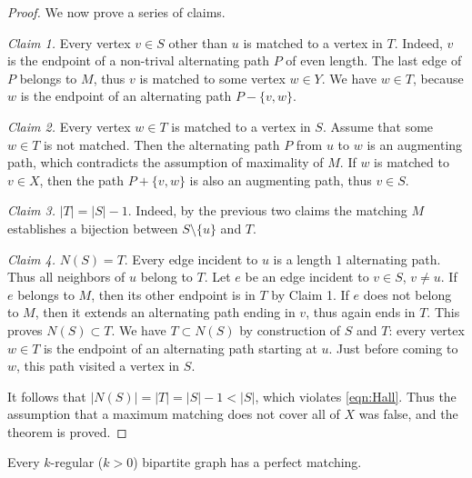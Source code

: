 \begin{page}
\begin{proof}
We now prove a series of claims.

\emph{Claim 1.} Every vertex $v \in S$ other than $u$ is matched to a vertex in $T$.
Indeed, $v$ is the endpoint of a non-trival alternating path $P$ of even length.
The last edge of $P$ belongs to $M$, thus $v$ is matched to some vertex $w \in Y$.
We have $w \in T$, because $w$ is the endpoint of an alternating path $P - \{v,w\}$.

\emph{Claim 2.} Every vertex $w \in T$ is matched to a vertex in $S$.
Assume that some $w \in T$ is not matched.
Then the alternating path $P$ from $u$ to $w$ is an augmenting path, which contradicts the assumption of maximality of $M$.
If $w$ is matched to $v \in X$, then the path $P + \{v,w\}$ is also an augmenting path, thus $v \in S$.

\emph{Claim 3.} $|T| = |S| - 1$.
Indeed, by the previous two claims the matching $M$ establishes a bijection between $S \setminus \{u\}$ and $T$.

\emph{Claim 4.} $N(S) = T$.
Every edge incident to $u$ is a length $1$ alternating path.
Thus all neighbors of $u$ belong to $T$.
Let $e$ be an edge incident to $v \in S$, $v \ne u$.
If $e$ belongs to $M$, then its other endpoint is in $T$ by Claim 1.
If $e$ does not belong to $M$, then it extends an alternating path ending in $v$, thus again ends in $T$.
This proves $N(S) \subset T$.
We have $T \subset N(S)$ by construction of $S$ and $T$: every vertex $w \in T$ is the endpoint of an alternating path starting at $u$.
Just before coming to $w$, this path visited a vertex in $S$.

It follows that $|N(S)| = |T| = |S| - 1 < |S|$, which violates \eqref{eqn:Hall}.
Thus the assumption that a maximum matching does not cover all of $X$ was false, and the theorem is proved.
\end{proof}



\end{page}

\begin{page}
\setcounter{section}{4}
\setcounter{subsection}{4}
\setcounter{dfn}{8}
\label{portion:397}

\begin{cor}
Every $k$-regular ($k>0$) bipartite graph has a perfect matching.
\end{cor}

\end{page}

